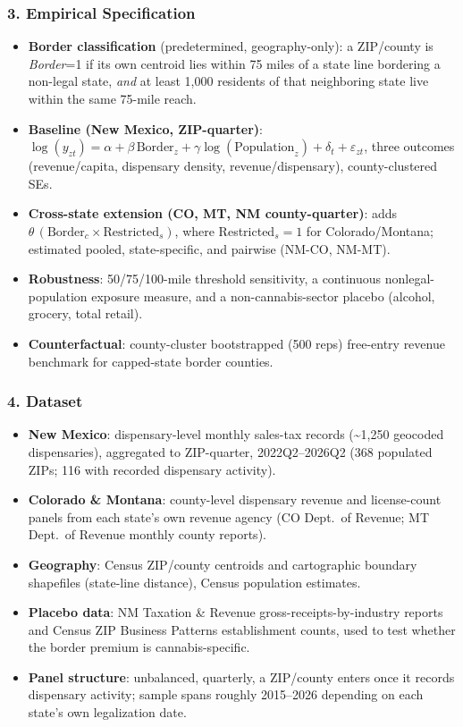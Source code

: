 \documentclass[11pt]{beamer}
\begin{document}
\begin{frame}
\frametitle{3. Empirical Specification}
\small
\begin{itemize}
  \item \textbf{Border classification} (predetermined, geography-only): a ZIP/county is \emph{Border}=1 if its own centroid lies within 75 miles of a state line bordering a non-legal state, \emph{and} at least 1{,}000 residents of that neighboring state live within the same 75-mile reach.
  \item \textbf{Baseline (New Mexico, ZIP-quarter)}: $\log(y_{zt}) = \alpha + \beta\,\text{Border}_z + \gamma\log(\text{Population}_z) + \delta_t + \varepsilon_{zt}$, three outcomes (revenue/capita, dispensary density, revenue/dispensary), county-clustered SEs.
  \item \textbf{Cross-state extension (CO, MT, NM county-quarter)}: adds $\theta\,(\text{Border}_c \times \text{Restricted}_s)$, where Restricted$_s=1$ for Colorado/Montana; estimated pooled, state-specific, and pairwise (NM-CO, NM-MT).
  \item \textbf{Robustness}: 50/75/100-mile threshold sensitivity, a continuous nonlegal-population exposure measure, and a non-cannabis-sector placebo (alcohol, grocery, total retail).
  \item \textbf{Counterfactual}: county-cluster bootstrapped (500 reps) free-entry revenue benchmark for capped-state border counties.
\end{itemize}
\end{frame}

\begin{frame}
\frametitle{4. Dataset}
\small
\begin{itemize}
  \item \textbf{New Mexico}: dispensary-level monthly sales-tax records (\textasciitilde1{,}250 geocoded dispensaries), aggregated to ZIP-quarter, 2022Q2--2026Q2 (368 populated ZIPs; 116 with recorded dispensary activity).
  \item \textbf{Colorado \& Montana}: county-level dispensary revenue and license-count panels from each state's own revenue agency (CO Dept.\ of Revenue; MT Dept.\ of Revenue monthly county reports).
  \item \textbf{Geography}: Census ZIP/county centroids and cartographic boundary shapefiles (state-line distance), Census population estimates.
  \item \textbf{Placebo data}: NM Taxation \& Revenue gross-receipts-by-industry reports and Census ZIP Business Patterns establishment counts, used to test whether the border premium is cannabis-specific.
  \item \textbf{Panel structure}: unbalanced, quarterly, a ZIP/county enters once it records dispensary activity; sample spans roughly 2015--2026 depending on each state's own legalization date.
\end{itemize}
\end{frame}
\end{document}
